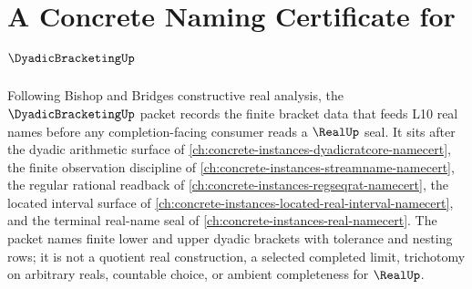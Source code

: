 \chapter{A Concrete Naming Certificate for $\DyadicBracketingUp$}
\label{ch:concrete-instances-dyadic-bracketing-namecert}

Following Bishop and Bridges constructive real analysis, the $\DyadicBracketingUp$ packet records the finite bracket data that feeds L10 real names before any completion-facing consumer reads a $\RealUp$ seal. It sits after the dyadic arithmetic surface of \autoref{ch:concrete-instances-dyadicratcore-namecert}, the finite observation discipline of \autoref{ch:concrete-instances-streamname-namecert}, the regular rational readback of \autoref{ch:concrete-instances-regseqrat-namecert}, the located interval surface of \autoref{ch:concrete-instances-located-real-interval-namecert}, and the terminal real-name seal of \autoref{ch:concrete-instances-real-namecert}. The packet names finite lower and upper dyadic brackets with tolerance and nesting rows; it is not a quotient real construction, a selected completed limit, trichotomy on arbitrary reals, countable choice, or ambient completeness for $\RealUp$.

